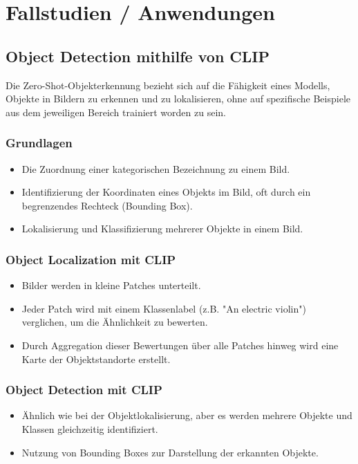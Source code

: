 \documentclass[nolibertine, ngerman, algorithm, nomencl, minted]{ttlab-qualify}
\begin{document}
\section{Fallstudien / Anwendungen}
\label{sec:Fallstudien-Anwendung}
\subsection{Object Detection mithilfe von CLIP}
Die Zero-Shot-Objekterkennung bezieht sich auf die Fähigkeit eines Modells, Objekte in Bildern zu erkennen und zu lokalisieren, 
ohne auf spezifische Beispiele aus dem jeweiligen Bereich trainiert worden zu sein. \parencite{pinecone_clip}
\subsubsection{Grundlagen}
\begin{itemize}
	\item Die Zuordnung einer kategorischen Bezeichnung zu einem Bild.
	\item Identifizierung der Koordinaten eines Objekts im Bild, oft durch ein begrenzendes Rechteck (Bounding Box).
	\item Lokalisierung und Klassifizierung mehrerer Objekte in einem Bild.
\end{itemize}

\subsubsection{Object Localization mit CLIP}
\begin{itemize}
	\item Bilder werden in kleine Patches unterteilt.
	\item Jeder Patch wird mit einem Klassenlabel (z.B. "An electric violin") verglichen, um die Ähnlichkeit zu bewerten.
	\item Durch Aggregation dieser Bewertungen über alle Patches hinweg wird eine Karte der Objektstandorte erstellt.
\end{itemize}

\subsubsection{Object Detection mit CLIP}
\begin{itemize}
	\item Ähnlich wie bei der Objektlokalisierung, aber es werden mehrere Objekte und Klassen gleichzeitig identifiziert.
	\item Nutzung von Bounding Boxes zur Darstellung der erkannten Objekte.
\end{itemize}
\end{document}
